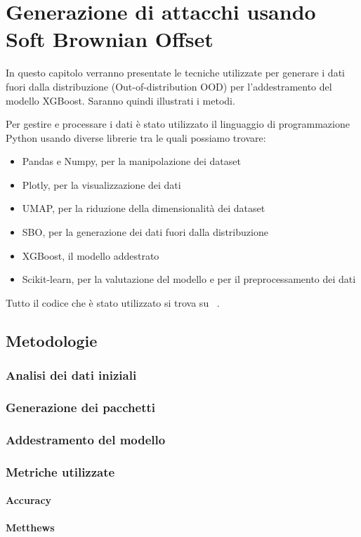 \chapter{Generazione di attacchi usando Soft Brownian Offset}

In questo capitolo verranno presentate le tecniche utilizzate per generare i dati fuori dalla distribuzione (Out-of-distribution OOD) per l'addestramento del modello XGBoost. Saranno quindi illustrati i metodi.


Per gestire e processare i dati è stato utilizzato il linguaggio di programmazione Python usando diverse librerie tra le quali possiamo trovare:

\begin{itemize}
    \item Pandas e Numpy, per la manipolazione dei dataset
    \item Plotly, per la visualizzazione dei dati
    \item UMAP, per la riduzione della dimensionalità dei dataset 
    \item SBO, per la generazione dei dati fuori dalla distribuzione
    \item XGBoost, il modello addestrato
    \item Scikit-learn, per la valutazione del modello e per il preprocessamento dei dati
\end{itemize}

Tutto il codice che è stato utilizzato si trova su ~\cite{github}.


\section{Metodologie}


\subsection{Analisi dei dati iniziali}

\subsection{Generazione dei pacchetti}

\subsection{Addestramento del modello}

\subsection{Metriche utilizzate}

\subsubsection{Accuracy}

\subsubsection{Metthews}

